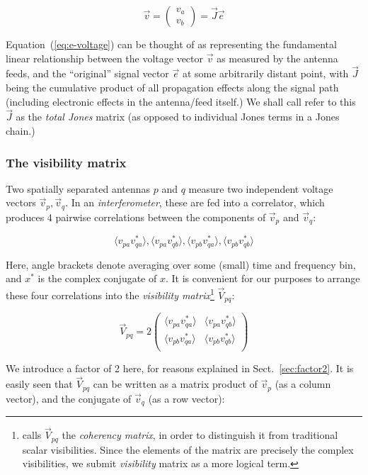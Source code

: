 \documentclass[]{aa}
\newcommand{\matrixtt}[4]{\left( \begin{array}{cc}#1&#2\\#3&#4\\\end{array} \right)}
\begin{document}
\begin{equation}\label{eq:e-voltage}
\vec v = \left( \begin{array}{c}v_a\\v_b\end{array} \right) = \vec J \vec e
\end{equation}
 
Equation~(\ref{eq:e-voltage}) can be thought of as representing the fundamental linear relationship between the voltage vector $\vec v$ as measured by the antenna feeds, and the ``original'' signal vector $\vec e$ at some arbitrarily distant point, with $\vec J$ being the cumulative product of all propagation effects along the signal path (including electronic effects in the antenna/feed itself.) We shall call refer to this $\vec J$ as the {\em total Jones} matrix (as opposed to individual Jones terms in a Jones chain.) 

\subsubsection{The visibility matrix}

Two spatially separated antennas $p$ and $q$ measure two independent voltage vectors $\vec v_p,\vec v_q$. In an {\em interferometer}, these are fed into a correlator, which produces 4 pairwise correlations between the components of $\vec v_p$ and $\vec v_q$:

    \begin{equation}\label{eq:correlation}
    \langle v_{pa}v^*_{qa}\rangle, \langle v_{pa}v^*_{qb}\rangle, 
    \langle v_{pb}v^*_{qa}\rangle, \langle v_{pb}v^*_{qb}\rangle
    \end{equation}

Here, angle brackets denote averaging over some (small) time and frequency bin, and $x^*$ is the complex conjugate of $x$.  It is convenient for our purposes to arrange these four correlations into the {\em visibility matrix\/}\footnote{\citet{ME4} calls $\vec V_{pq}$ the {\em coherency matrix}, in order to distinguish it from traditional scalar visibilities. Since the elements of the matrix are precisely the complex visibilities, we submit {\em visibility} matrix as a more logical term.} $\vec V_{pq}$:

    \[
    \vec V_{pq} = 2 \matrixtt{\langle v_{pa}v^*_{qa}\rangle}{\langle v_{pa}v^*_{qb}\rangle}{\langle v_{pb}v^*_{qa}\rangle}{\langle v_{pb}v^*_{qb}\rangle}
    \]

We introduce a factor of 2 here, for reasons explained in Sect.~\ref{sec:factor2}. It is easily seen that $\vec V_{pq}$ can be written as a matrix product of $\vec v_p$ (as a column vector), and the conjugate of $\vec v_q$ (as a row vector):
\end{document}

